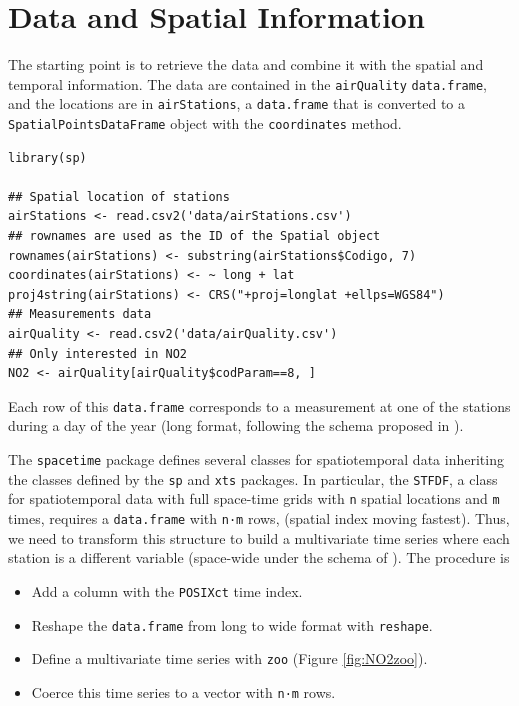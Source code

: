 \documentclass[smallroyalvopaper]{memoir}
\begin{document}
\section{Data and Spatial Information}
\label{sec-2}

The starting point is to retrieve the data and combine it with the
spatial and temporal information. The data are contained in the
\texttt{airQuality} \texttt{data.frame}, and the locations are in \texttt{airStations}, a
\texttt{data.frame} that is converted to a \texttt{SpatialPointsDataFrame} object
with the \texttt{coordinates} method.


\lstset{language=R,numbers=none}
\begin{lstlisting}
library(sp)

## Spatial location of stations
airStations <- read.csv2('data/airStations.csv')
## rownames are used as the ID of the Spatial object
rownames(airStations) <- substring(airStations$Codigo, 7)
coordinates(airStations) <- ~ long + lat
proj4string(airStations) <- CRS("+proj=longlat +ellps=WGS84")
## Measurements data
airQuality <- read.csv2('data/airQuality.csv')
## Only interested in NO2 
NO2 <- airQuality[airQuality$codParam==8, ]
\end{lstlisting}

Each row of this \texttt{data.frame} corresponds to a measurement at one
of the stations during a day of the year (long format, following
the schema proposed in \cite{Pebesma2012}).

The \texttt{spacetime} package defines several classes for spatiotemporal
data inheriting the classes defined by the \texttt{sp} and \texttt{xts} packages.
In particular, the \texttt{STFDF}, a class for spatiotemporal data with full
space-time grids with \texttt{n} spatial locations and \texttt{m} times, requires a
\texttt{data.frame} with \texttt{n·m} rows, (spatial index moving fastest).  Thus,
we need to transform this structure to build a multivariate time
series where each station is a different variable (space-wide under
the schema of \cite{Pebesma2012}). The procedure is

\begin{itemize}
\item Add a column with the \texttt{POSIXct} time index.
\item Reshape the \texttt{data.frame} from long to wide format with
  \texttt{reshape}.
\item Define a multivariate time series with \texttt{zoo} (Figure
  \ref{fig:NO2zoo}).
\item Coerce this time series to a vector with \texttt{n·m} rows.
\end{itemize}
\end{document}
